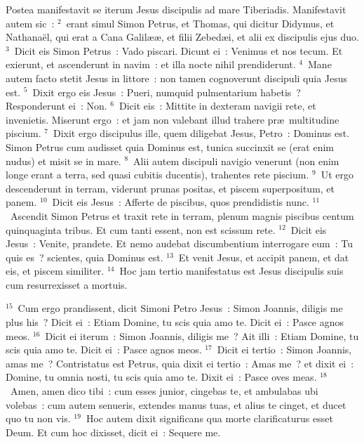 \lettrine[lines=3,image=true,loversize=0.05,lraise=-0.03]{P}{}ostea manifestavit se iterum Jesus discipulis ad mare Tiberiadis. Manifestavit autem sic~:
${}^{2}$~erant simul Simon Petrus, et Thomas, qui dicitur Didymus, et Nathana\"el, qui erat a Cana Galil\ae \ae , et filii Zebed\ae i, et alii ex discipulis ejus duo.
${}^{3}$~Dicit eis Simon Petrus~: Vado piscari. Dicunt ei~: Venimus et nos tecum. Et exierunt, et ascenderunt in navim~: et illa nocte nihil prendiderunt.
${}^{4}$~Mane autem facto stetit Jesus in littore~: non tamen cognoverunt discipuli quia Jesus est.
${}^{5}$~Dixit ergo eis Jesus~: Pueri, numquid pulmentarium habetis~? Responderunt ei~: Non.
${}^{6}$~Dicit eis~: Mittite in dexteram navigii rete, et invenietis. Miserunt ergo~: et jam non valebant illud trahere pr\ae\ multitudine piscium.
${}^{7}$~Dixit ergo discipulus ille, quem diligebat Jesus, Petro~: Dominus est. Simon Petrus cum audisset quia Dominus est, tunica succinxit se (erat enim nudus) et misit se in mare.
${}^{8}$~Alii autem discipuli navigio venerunt (non enim longe erant a terra, sed quasi cubitis ducentis), trahentes rete piscium.
${}^{9}$~Ut ergo descenderunt in terram, viderunt prunas positas, et piscem superpositum, et panem.
${}^{10}$~Dicit eis Jesus~: Afferte de piscibus, quos prendidistis nunc.
${}^{11}$~Ascendit Simon Petrus et traxit rete in terram, plenum magnis piscibus centum quinquaginta tribus. Et cum tanti essent, non est scissum rete.
${}^{12}$~Dicit eis Jesus~: Venite, prandete. Et nemo audebat discumbentium interrogare eum~: Tu quis es~? scientes, quia Dominus est.
${}^{13}$~Et venit Jesus, et accipit panem, et dat eis, et piscem similiter.
${}^{14}$~Hoc jam tertio manifestatus est Jesus discipulis suis cum resurrexisset a mortuis.


${}^{15}$~Cum ergo prandissent, dicit Simoni Petro Jesus~: Simon Joannis, diligis me plus his~? Dicit ei~: Etiam Domine, tu scis quia amo te. Dicit ei~: Pasce agnos meos.
${}^{16}$~Dicit ei iterum~: Simon Joannis, diligis me~? Ait illi~: Etiam Domine, tu scis quia amo te. Dicit ei~: Pasce agnos meos.
${}^{17}$~Dicit ei tertio~: Simon Joannis, amas me~? Contristatus est Petrus, quia dixit ei tertio~: Amas me~? et dixit ei~: Domine, tu omnia nosti, tu scis quia amo te. Dixit ei~: Pasce oves meas.
${}^{18}$~Amen, amen dico tibi~: cum esses junior, cingebas te, et ambulabas ubi volebas~: cum autem senueris, extendes manus tuas, et alius te cinget, et ducet quo tu non vis.
${}^{19}$~Hoc autem dixit significans qua morte clarificaturus esset Deum. Et cum hoc dixisset, dicit ei~: Sequere me.


